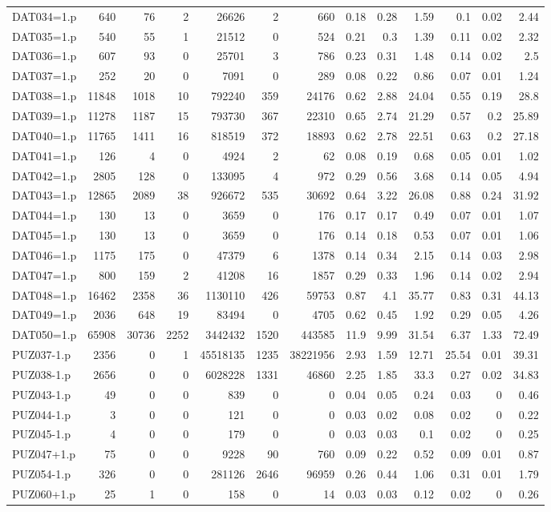 \begin{table}[H]
\begin{adjustwidth}{-1.1in}{-0.5in}
\begin{tabular}{| l || r | r | r || r | r | r || r | r | r | r | r | r |}
DAT034=1.p&640&76&2&26626&2&660&0.18&0.28&1.59&0.1&0.02&2.44\\
DAT035=1.p&540&55&1&21512&0&524&0.21&0.3&1.39&0.11&0.02&2.32\\
DAT036=1.p&607&93&0&25701&3&786&0.23&0.31&1.48&0.14&0.02&2.5\\
DAT037=1.p&252&20&0&7091&0&289&0.08&0.22&0.86&0.07&0.01&1.24\\
DAT038=1.p&11848&1018&10&792240&359&24176&0.62&2.88&24.04&0.55&0.19&28.8\\
DAT039=1.p&11278&1187&15&793730&367&22310&0.65&2.74&21.29&0.57&0.2&25.89\\
DAT040=1.p&11765&1411&16&818519&372&18893&0.62&2.78&22.51&0.63&0.2&27.18\\
DAT041=1.p&126&4&0&4924&2&62&0.08&0.19&0.68&0.05&0.01&1.02\\
DAT042=1.p&2805&128&0&133095&4&972&0.29&0.56&3.68&0.14&0.05&4.94\\
DAT043=1.p&12865&2089&38&926672&535&30692&0.64&3.22&26.08&0.88&0.24&31.92\\
DAT044=1.p&130&13&0&3659&0&176&0.17&0.17&0.49&0.07&0.01&1.07\\
DAT045=1.p&130&13&0&3659&0&176&0.14&0.18&0.53&0.07&0.01&1.06\\
DAT046=1.p&1175&175&0&47379&6&1378&0.14&0.34&2.15&0.14&0.03&2.98\\
DAT047=1.p&800&159&2&41208&16&1857&0.29&0.33&1.96&0.14&0.02&2.94\\
DAT048=1.p&16462&2358&36&1130110&426&59753&0.87&4.1&35.77&0.83&0.31&44.13\\
DAT049=1.p&2036&648&19&83494&0&4705&0.62&0.45&1.92&0.29&0.05&4.26\\
DAT050=1.p&65908&30736&2252&3442432&1520&443585&11.9&9.99&31.54&6.37&1.33&72.49\\
PUZ037-1.p&2356&0&1&45518135&1235&38221956&2.93&1.59&12.71&25.54&0.01&39.31\\
PUZ038-1.p&2656&0&0&6028228&1331&46860&2.25&1.85&33.3&0.27&0.02&34.83\\
PUZ043-1.p&49&0&0&839&0&0&0.04&0.05&0.24&0.03&0&0.46\\
PUZ044-1.p&3&0&0&121&0&0&0.03&0.02&0.08&0.02&0&0.22\\
PUZ045-1.p&4&0&0&179&0&0&0.03&0.03&0.1&0.02&0&0.25\\
PUZ047+1.p&75&0&0&9228&90&760&0.09&0.22&0.52&0.09&0.01&0.87\\
PUZ054-1.p&326&0&0&281126&2646&96959&0.26&0.44&1.06&0.31&0.01&1.79\\
PUZ060+1.p&25&1&0&158&0&14&0.03&0.03&0.12&0.02&0&0.26\\

\end{tabular}
\end{adjustwidth}
\end{table}
